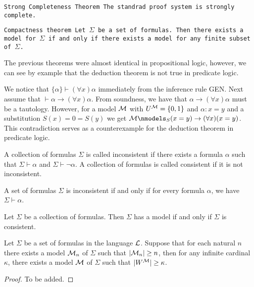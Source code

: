 \documentclass[11pt,a4paper]{article}
\renewcommand{\implies}{\rightarrow}
\begin{document}
  \begin{theorem}\tt{Strong Completeness Theorem}
    The standrad proof system is strongly complete.
  \end{theorem}

  \begin{theorem}\tt{Compactness theorem}
    Let $\Sigma$ be a set of formulas.
    Then there exists a model for $\Sigma$ if and only if
    there exists a model for any finite subset of $\Sigma$.
  \end{theorem}

  The previous theorems were almost identical in propositional logic,
  however, we can see by example that the deduction theorem is not
  true in predicate logic.

  \begin{example}
    We notice that $\{\alpha\} \vdash (\forall x) \alpha$ immediately
    from the inference rule GEN.
    Next assume that $\vdash \alpha \implies (\forall x) \alpha$.
    From soundness, we have that $\alpha \implies (\forall x) \alpha$
    must be a tautology.
    However, for a model $\mathcal{M}$ with $U^{\mathcal{M}} = \{0,1\}$ and 
    $\alpha \colon x = y$ and a substitution $S(x) = 0 = S(y)$ we get
    $\M \nmodels_S (x = y) \implies (\forall x)(x = y)$.
    This contradiction serves as a counterexample for the deduction theorem
    in predicate logic.
  \end{example}

  \begin{definition}
    A collection of formulas $\Sigma$ is called inconsistent if there 
    exists a formula $\alpha$ such that $\Sigma \vdash \alpha$ and
    $\Sigma \vdash \neg \alpha$.
    A collection of formulas is called consistent if it is not inconsistent.
  \end{definition}
  
  \begin{proposition}
    A set of formulas $\Sigma$ is inconsistent if and only if for every 
    formula $\alpha$, we have $\Sigma \vdash \alpha$.
  \end{proposition}

  \begin{proposition}
    Let $\Sigma$ be a collection of formulas.
    Then $\Sigma$ has a model if and only if $\Sigma$ is consistent.
  \end{proposition}

  \begin{theorem}\label{thm:finite-infinite}
    Let $\Sigma$ be a set of formulas in the language $\mathcal{L}$.
    Suppose that for each natural $n$ there exists a model $\mathcal{M}_n$ of 
    $\Sigma$ such that $|\mathcal{M}_n| \geq n$, 
    then for any infinite cardinal $\kappa$, there exists a model 
    $\mathcal{M}$ of $\Sigma$ such that $|W^{\mathcal{M}}| \geq \kappa$.
  \end{theorem}
  \begin{proof}
    To be added.
  \end{proof}
\end{document}
